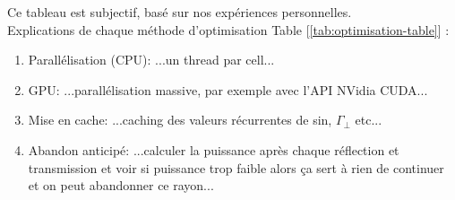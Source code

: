 Ce tableau est subjectif, basé sur nos expériences personnelles.\\
Explications de chaque méthode d'optimisation Table [\ref{tab:optimisation-table}] :
\begin{enumerate}
    \item Parallélisation (CPU): ...un thread par cell...
    \item GPU: ...parallélisation massive, par exemple avec l'API NVidia CUDA...
    \item Mise en cache: ...caching des valeurs récurrentes de sin, $\Gamma_\perp$ etc...
    \item  Abandon anticipé: ...calculer la puissance après chaque réflection et transmission et voir si puissance trop faible alors ça sert à rien de continuer et on peut abandonner ce rayon...
\end{enumerate}
